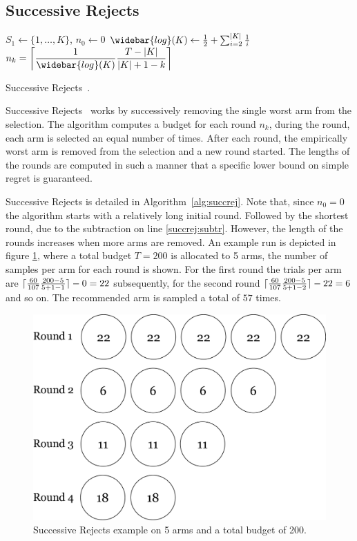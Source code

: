 \documentclass{kecsmstr}
\DeclarePairedDelimiter{\ceil}{\lceil}{\rceil}
\begin{document}
\subsection{Successive Rejects}
\IncMargin{1em}
\begin{algorithm2e}[ht]
	\Indm
	\vspace{0.2cm}
	\Indp
	$S_1 \gets \{1,\dots,K\}$, $n_0 \gets 0$										\; 
	$\widebar{log}(K) \gets \frac{1}{2} + \sum_{i=2}^{|K|} \frac{1}{i}$				\;
	\BlankLine
	 {
		$n_k = \displaystyle\ceil[\bigg]{\frac{1}{\widebar{log}(K)} \frac{T-|K|}{|K|+1-k}}$				\;
	}
	\BlankLine
	\BlankLine
  \caption[Successive Rejects]{Successive Rejects~\protect{}. \label{alg:succrej}}
\end{algorithm2e}
\DecMargin{1em}

Successive Rejects~ works by successively removing the single worst arm from the selection. The algorithm computes a budget for each round $n_k$, during the round, each arm is selected an equal number of times. After each round, the empirically worst arm is removed from the selection and a new round started. The lengths of the rounds are computed in such a manner that a specific lower bound on simple regret is guaranteed.

Successive Rejects is detailed in Algorithm~\ref{alg:succrej}. Note that, since $n_0 = 0$ the algorithm starts with a relatively long initial round. Followed by the shortest round, due to the subtraction on line \ref{succrej:subtr}. However, the length of the rounds increases when more arms are removed. An example run is depicted in figure \ref{fig:succ-rej}, where a total budget $T = 200$ is allocated to 5 arms, the number of samples per arm for each round is shown. For the first round the trials per arm are $\ceil{\frac{60}{107} \frac{200-5}{5+1-1}} - 0 = 22$ subsequently, for the second round $\ceil{\frac{60}{107} \frac{200-5}{5+1-2}} - 22 = 6$ and so on. The recommended arm is sampled a total of $57$ times.

\begin{figure}[ht]
	\centering
	\includegraphics[width=.6\textwidth]{img/succ_rej.png}
	\caption{Successive Rejects example on 5 arms and a total budget of 200.}
	\label{fig:succ-rej}
\end{figure}
\end{document}
